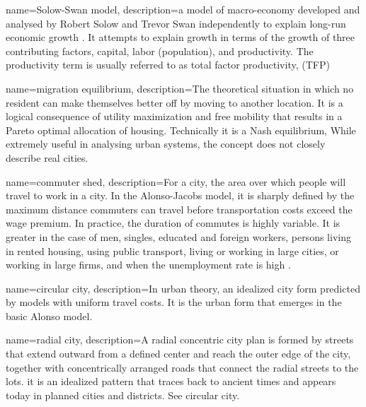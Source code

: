 {
name=Solow-Swan model,
description={a  model of macro-economy developed and analysed by Robert Solow and Trevor Swan independently to explain long-run economic growth \cite{dimandTrevorSwanNeoclassical2009}. It attempts to explain  growth in terms of the growth of three contributing factors, capital, labor (population), and  productivity. The productivity term is usually referred to as \gls{total factor productivity}, (TFP)}
}

{
name=migration equilibrium,
description={The theoretical situation in which no resident can  make themselves better off by moving to another location. It is a logical consequence of utility maximization and free mobility that results in a Pareto optimal allocation of housing. Technically it is a Nash equilibrium, While extremely useful in analysing urban systems, the concept does not closely describe real cities.
}
}

{
name=commuter shed,
description={For a city, the area over which people will travel to work in a city. In the \gls{Alonso-Jacobs model}, it is sharply defined by the maximum distance commuters can travel before transportation costs exceed the wage premium. In  practice, the duration of commutes is highly variable. It is greater in the case of men, singles, educated and foreign workers, persons living in rented housing, using public transport, living or working in large cities, or working in large firms,  and when the  unemployment rate is high\cite{axisaFactorsInfluencingCommute2012} .}
}

{
name=circular city,
description={In urban theory, an idealized city form predicted by models with uniform travel costs. It is the urban form that emerges in the basic \gls{Alonso model}. %
}
}

{
name=radial city,
description={A radial concentric city plan is formed by streets that extend outward from a defined center and reach the outer edge of the city, together with concentrically arranged roads that connect the radial streets to the lots. it is an idealized pattern that traces back to ancient times and appears  today in planned cities and districts. See \gls{circular city}.}
}

